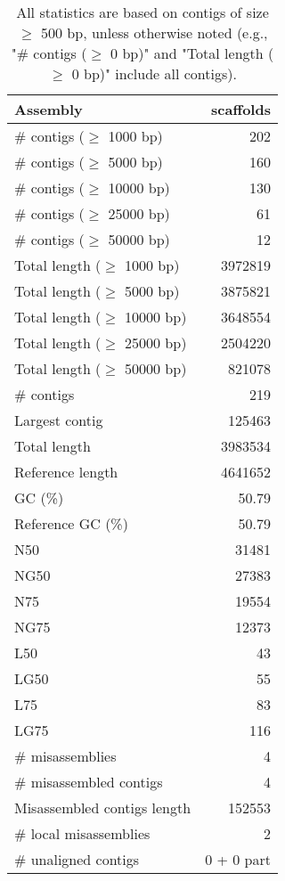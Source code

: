 \documentclass[12pt,a4paper]{article}
\begin{document}
\begin{table}[ht]
\begin{center}
\caption{All statistics are based on contigs of size $\geq$ 500 bp, unless otherwise noted (e.g., "\# contigs ($\geq$ 0 bp)" and "Total length ($\geq$ 0 bp)" include all contigs).}
\begin{tabular}{|l*{1}{|r}|}
\hline
Assembly & scaffolds \\ \hline
\# contigs ($\geq$ 1000 bp) & 202 \\ \hline
\# contigs ($\geq$ 5000 bp) & 160 \\ \hline
\# contigs ($\geq$ 10000 bp) & 130 \\ \hline
\# contigs ($\geq$ 25000 bp) & 61 \\ \hline
\# contigs ($\geq$ 50000 bp) & 12 \\ \hline
Total length ($\geq$ 1000 bp) & 3972819 \\ \hline
Total length ($\geq$ 5000 bp) & 3875821 \\ \hline
Total length ($\geq$ 10000 bp) & 3648554 \\ \hline
Total length ($\geq$ 25000 bp) & 2504220 \\ \hline
Total length ($\geq$ 50000 bp) & 821078 \\ \hline
\# contigs & 219 \\ \hline
Largest contig & 125463 \\ \hline
Total length & 3983534 \\ \hline
Reference length & 4641652 \\ \hline
GC (\%) & 50.79 \\ \hline
Reference GC (\%) & 50.79 \\ \hline
N50 & 31481 \\ \hline
NG50 & 27383 \\ \hline
N75 & 19554 \\ \hline
NG75 & 12373 \\ \hline
L50 & 43 \\ \hline
LG50 & 55 \\ \hline
L75 & 83 \\ \hline
LG75 & 116 \\ \hline
\# misassemblies & 4 \\ \hline
\# misassembled contigs & 4 \\ \hline
Misassembled contigs length & 152553 \\ \hline
\# local misassemblies & 2 \\ \hline
\# unaligned contigs & 0 + 0 part \\ \hline

\end{tabular}
\end{center}
\end{table}
\end{document}
